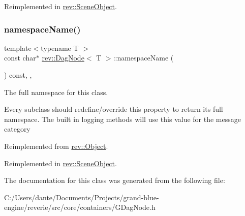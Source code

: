 Reimplemented in \mbox{\hyperlink{classrev_1_1_scene_object_a511357629f9d5957355f9a5cec239ec4}{rev\+::\+Scene\+Object}}.

\mbox{\label{classrev_1_1_dag_node_a65d5289cdff9f83fde666474c33f4a5b}} 
\subsubsection{\texorpdfstring{namespaceName()}{namespaceName()}}
{\footnotesize\ttfamily template$<$typename T $>$ \\
const char$\ast$ \mbox{\hyperlink{classrev_1_1_dag_node}{rev\+::\+Dag\+Node}}$<$ T $>$\+::namespace\+Name (\begin{DoxyParamCaption}{ }\end{DoxyParamCaption}) const\hspace{0.3cm}{\ttfamily [inline]}, {\ttfamily [override]}, {\ttfamily [virtual]}}



The full namespace for this class. 

Every subclass should redefine/override this property to return its full namespace. The built in logging methods will use this value for the message category 

Reimplemented from \mbox{\hyperlink{classrev_1_1_object_aaeb638d3e10f361c56c211a318a27f3d}{rev\+::\+Object}}.



Reimplemented in \mbox{\hyperlink{classrev_1_1_scene_object_a63816cdf271b38d1e058c2c2847a0f1e}{rev\+::\+Scene\+Object}}.



The documentation for this class was generated from the following file\+:\begin{DoxyCompactItemize}
\item 
C\+:/\+Users/dante/\+Documents/\+Projects/grand-\/blue-\/engine/reverie/src/core/containers/G\+Dag\+Node.\+h\end{DoxyCompactItemize}

